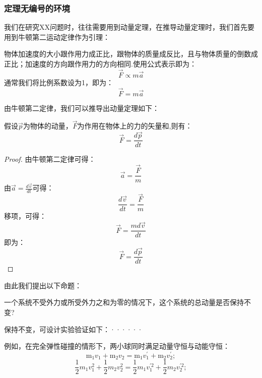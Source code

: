 \subsubsection{定理无编号的环境} %

我们在研究XX问题时，往往需要用到动量定理，在推导动量定理时，我们首先要用到牛顿第二运动定律作为引理：
\begin{lemma*}[牛顿第二运动定律] 
	
	物体加速度的大小跟作用力成正比，跟物体的质量成反比，且与物体质量的倒数成正比；加速度的方向跟作用力的方向相同.使用公式表示即为：
	$$ \vec{F}\propto m\vec{a} $$
	通常我们将比例系数设为1，即为：
	$$\vec{F}= m\vec{a}$$
	
\end{lemma*}

由牛顿第二定律，我们可以推导出动量定理如下：
\begin{theorem*}[动量定理]
	假设$\vec{p}$为物体的动量，$\vec{F}$为作用在物体上的力的矢量和,则有：
	$$\vec{F}=\frac{d\vec{p}}{dt}$$
\end{theorem*}

\begin{proof}
	由牛顿第二定律可得：$$ \vec{a}=\frac{\vec{F}}{m}$$
	由$\vec{a}=\frac{d\vec{v}}{dt}$可得：
	$$\frac{d\vec{v}}{dt}=\frac{\vec{F}}{m}$$
	移项，可得：
	$$\vec{F}=\frac{md\vec{v}}{dt}$$
	即为：
	$$\vec{F}=\frac{d\vec{p}}{dt}$$
\end{proof}

由此我们提出以下命题：
\begin{problem*}[动量是否守恒]
	一个系统不受外力或所受外力之和为零的情况下，这个系统的总动量是否保持不变?
\end{problem*}

\begin{solution}
	保持不变，可设计实验验证如下：······
\end{solution}

\begin{example*}[完全弹性碰撞]
	例如，在完全弹性碰撞的情形下，两小球同时满足动量守恒与动能守恒：
	$$\mathrm{m}_{1} v_{1}+\mathrm{m}_{2} v_{2}=\mathrm{m}_{1} v_{1}^{\prime}+\mathrm{m}_{2} v_{2}^{\prime}; $$
	$$\frac{1}{2} m_{1} v_{1}^{2}+\frac{1}{2} m_{2} v_{2}^{2}=\frac{1}{2} m_{1} v_{1}^{\prime 2}+\frac{1}{2} m_{2} v_{2}^{\prime 2} ;$$
\end{example*}